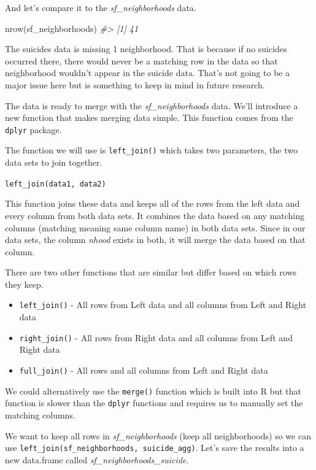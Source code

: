 \documentclass[
]{krantz}
\makeatletter
\newenvironment{Shaded}{\begin{snugshade}}{\end{snugshade}}
\newcommand{\CommentTok}[1]{\textcolor[rgb]{0.37,0.37,0.37}{\textit{#1}}}
\newcommand{\FunctionTok}[1]{\textcolor[rgb]{0,0,0}{#1}}
\newcommand{\NormalTok}[1]{#1}
\providecommand{\tightlist}{%
  \setlength{\itemsep}{0pt}\setlength{\parskip}{0pt}}
\newenvironment{kframe}{%
\medskip{}
\setlength{\fboxsep}{.8em}
 \def\at@end@of@kframe{}%
 \ifinner\ifhmode%
  \def\at@end@of@kframe{\end{minipage}}%
  \begin{minipage}{\columnwidth}%
 \fi\fi%
 \def\FrameCommand##1{\hskip\@totalleftmargin \hskip-\fboxsep
 \colorbox{shadecolor}{##1}\hskip-\fboxsep
     \hskip-\linewidth \hskip-\@totalleftmargin \hskip\columnwidth}%
 \MakeFramed {\advance\hsize-\width
   \@totalleftmargin\z@ \linewidth\hsize
   \@setminipage}}%
 {\par\unskip\endMakeFramed%
 \at@end@of@kframe}
\renewenvironment{Shaded}{\begin{kframe}}{\end{kframe}}
\makeatother
\begin{document}
And let's compare it to the \emph{sf\_neighborhoods} data.

\begin{Shaded}
\begin{Highlighting}[]
\FunctionTok{nrow}\NormalTok{(sf\_neighborhoods)}
\CommentTok{\#\textgreater{} [1] 41}
\end{Highlighting}
\end{Shaded}

The suicides data is missing 1 neighborhood. That is because if no suicides occurred there, there would never be a matching row in the data so that neighborhood wouldn't appear in the suicide data. That's not going to be a major issue here but is something to keep in mind in future research.

The data is ready to merge with the \emph{sf\_neighborhoods} data. We'll introduce a new function that makes merging data simple. This function comes from the \texttt{dplyr} package.

The function we will use is \texttt{left\_join()} which takes two parameters, the two data sets to join together.

\texttt{left\_join(data1,\ data2)}

This function joins these data and keeps all of the rows from the left data and every column from both data sets. It combines the data based on any matching columns (matching meaning same column name) in both data sets. Since in our data sets, the column \emph{nhood} exists in both, it will merge the data based on that column.

There are two other functions that are similar but differ based on which rows they keep.

\begin{itemize}
\tightlist
\item
  \texttt{left\_join()} - All rows from Left data and all columns from Left and Right data
\item
  \texttt{right\_join()} - All rows from Right data and all columns from Left and Right data
\item
  \texttt{full\_join()} - All rows and all columns from Left and Right data
\end{itemize}

We could alternatively use the \texttt{merge()} function which is built into R but that function is slower than the \texttt{dplyr} functions and requires us to manually set the matching columns.

We want to keep all rows in \emph{sf\_neighborhoods} (keep all neighborhoods) so we can use \texttt{left\_join(sf\_neighborhoods,\ suicide\_agg)}. Let's save the results into a new data.frame called \emph{sf\_neighborhoods\_suicide}.
\end{document}
